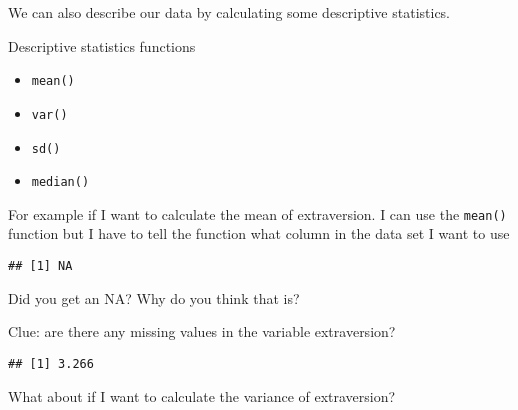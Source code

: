 \documentclass[
]{article}
\newenvironment{Shaded}{\begin{snugshade}}{\end{snugshade}}
\newcommand{\AttributeTok}[1]{\textcolor[rgb]{0.13,0.29,0.53}{#1}}
\newcommand{\CommentTok}[1]{\textcolor[rgb]{0.56,0.35,0.01}{\textit{#1}}}
\newcommand{\ConstantTok}[1]{\textcolor[rgb]{0.56,0.35,0.01}{#1}}
\newcommand{\FunctionTok}[1]{\textcolor[rgb]{0.13,0.29,0.53}{\textbf{#1}}}
\newcommand{\NormalTok}[1]{#1}
\newcommand{\SpecialCharTok}[1]{\textcolor[rgb]{0.81,0.36,0.00}{\textbf{#1}}}
\providecommand{\tightlist}{%
  \setlength{\itemsep}{0pt}\setlength{\parskip}{0pt}}
\begin{document}
We can also describe our data by calculating some descriptive
statistics.

Descriptive statistics functions

\begin{itemize}
\tightlist
\item
  \texttt{mean()}
\item
  \texttt{var()}
\item
  \texttt{sd()}
\item
  \texttt{median()}
\end{itemize}

For example if I want to calculate the mean of extraversion. I can use
the \texttt{mean()} function but I have to tell the function what column
in the data set I want to use

\begin{Shaded}
\end{Shaded}

\begin{verbatim}
## [1] NA
\end{verbatim}

Did you get an NA? Why do you think that is?

Clue: are there any missing values in the variable extraversion?

\begin{Shaded}
\end{Shaded}

\begin{verbatim}
## [1] 3.266
\end{verbatim}

What about if I want to calculate the variance of extraversion?

\begin{Shaded}
\end{Shaded}
\end{document}
